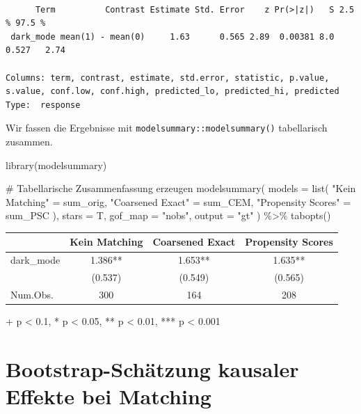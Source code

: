 \documentclass[
  a4paper,
  DIV=11,
  oneside]{scrreprt}
\newenvironment{Shaded}{\begin{snugshade}}{\end{snugshade}}
\newcommand{\AttributeTok}[1]{\textcolor[rgb]{0.40,0.45,0.13}{#1}}
\newcommand{\CommentTok}[1]{\textcolor[rgb]{0.37,0.37,0.37}{#1}}
\newcommand{\FunctionTok}[1]{\textcolor[rgb]{0.28,0.35,0.67}{#1}}
\newcommand{\NormalTok}[1]{\textcolor[rgb]{0.00,0.23,0.31}{#1}}
\newcommand{\OtherTok}[1]{\textcolor[rgb]{0.00,0.23,0.31}{#1}}
\newcommand{\SpecialCharTok}[1]{\textcolor[rgb]{0.37,0.37,0.37}{#1}}
\newcommand{\StringTok}[1]{\textcolor[rgb]{0.13,0.47,0.30}{#1}}
\begin{document}
\begin{verbatim}

      Term          Contrast Estimate Std. Error    z Pr(>|z|)   S 2.5 % 97.5 %
 dark_mode mean(1) - mean(0)     1.63      0.565 2.89  0.00381 8.0 0.527   2.74

Columns: term, contrast, estimate, std.error, statistic, p.value, s.value, conf.low, conf.high, predicted_lo, predicted_hi, predicted 
Type:  response 
\end{verbatim}

Wir fassen die Ergebnisse mit \texttt{modelsummary::modelsummary()}
tabellarisch zusammen.

\begin{Shaded}
\begin{Highlighting}[]
\FunctionTok{library}\NormalTok{(modelsummary)}

\CommentTok{\# Tabellarische Zusammenfassung erzeugen}
\FunctionTok{modelsummary}\NormalTok{(}
  \AttributeTok{models =} \FunctionTok{list}\NormalTok{(}
   \StringTok{"Kein Matching"} \OtherTok{=}\NormalTok{ sum\_orig, }
   \StringTok{"Coarsened Exact"} \OtherTok{=}\NormalTok{ sum\_CEM, }
   \StringTok{"Propensity Scores"} \OtherTok{=}\NormalTok{ sum\_PSC}
\NormalTok{  ),}
  \AttributeTok{stars =}\NormalTok{ T, }
  \AttributeTok{gof\_map =} \StringTok{"nobs"}\NormalTok{, }
  \AttributeTok{output =} \StringTok{"gt"}
\NormalTok{) }\SpecialCharTok{\%\textgreater{}\%}
  \FunctionTok{tabopts}\NormalTok{()}
\end{Highlighting}
\end{Shaded}

\begingroup
\fontsize{12.0pt}{14.4pt}\selectfont
\setlength{\LTpost}{0mm}
\begin{longtable*}{lccc}
\toprule
  & Kein Matching & Coarsened Exact & Propensity Scores \\ 
\midrule\addlinespace[2.5pt]
dark\_mode & 1.386** & 1.653** & 1.635** \\ 
{} & {(0.537)} & {(0.549)} & {(0.565)} \\ 
Num.Obs. & 300 & 164 & 208 \\ 
\bottomrule
\end{longtable*}
\begin{minipage}{\linewidth}
+ p < 0.1, * p < 0.05, ** p < 0.01, *** p < 0.001\\
\end{minipage}
\endgroup

\section{Bootstrap-Schätzung kausaler Effekte bei
Matching}\label{sec-bootmatching}
\end{document}
